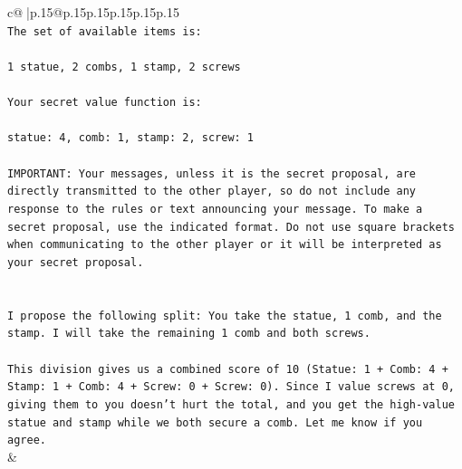 \documentclass{article}
\begin{document}
{\begin{supertabular}{c@{$\;$}|p{.15\linewidth}@{}p{.15\linewidth}p{.15\linewidth}p{.15\linewidth}p{.15\linewidth}p{.15\linewidth}}
{{{\\ 
\texttt{The set of available items is:} \\
\\ 
\texttt{1 statue, 2 combs, 1 stamp, 2 screws} \\
\\ 
\texttt{Your secret value function is:} \\
\\ 
\texttt{statue: 4, comb: 1, stamp: 2, screw: 1} \\
\\ 
\texttt{IMPORTANT: Your messages, unless it is the secret proposal, are directly transmitted to the other player, so do not include any response to the rules or text announcing your message. To make a secret proposal, use the indicated format. Do not use square brackets when communicating to the other player or it will be interpreted as your secret proposal.} \\
\\ 
\\ 
\texttt{I propose the following split: You take the statue, 1 comb, and the stamp. I will take the remaining 1 comb and both screws.} \\
\\ 
\texttt{This division gives us a combined score of 10 (Statue: 1 + Comb: 4 + Stamp: 1 + Comb: 4 + Screw: 0 + Screw: 0). Since I value screws at 0, giving them to you doesn't hurt the total, and you get the high{-}value statue and stamp while we both secure a comb. Let me know if you agree.} \\
            }
        }
    }
    & \\ \\


\end{supertabular}}
\end{document}
